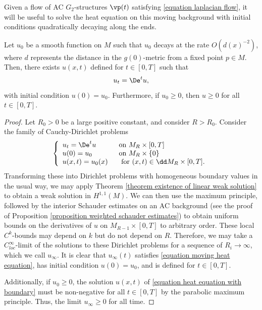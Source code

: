\documentclass[hidelinks, 12pt, oneside, reqno]{amsart}
\begin{document}
Given a flow of AC $G_2$-structures $\vp(t)$ satisfying \eqref{equation laplacian flow}, it will be useful to solve the heat equation on this moving background with initial conditions quadratically decaying along the ends.

\begin{lem}\label{lemma existence of heat solution}
Let $u_0$ be a smooth function on $M$ such that $u_0$ decays at the rate $O(d(x)^{-2})$, where $d$ represents the distance in the $g(0)$-metric from a fixed point $p \in M$. Then, there exists $u(x,t)$ defined for $t \in [0,T]$ such that
\begin{equation}\label{equation moving heat equation}
u_t = \De^t u,
\end{equation}
with initial condition $u(0) = u_0$. Furthermore, if $u_0 \ge 0$, then $u \ge 0$ for all $t \in [0,T]$. 
\end{lem}

\begin{proof}
Let $R_0 >0$ be a large positive constant, and consider $R > R_0$. Consider the family of Cauchy-Dirichlet problems
\begin{equation}\label{equation heat equation with boundary}
    \left\{
    \begin{array}{ll}
      u_t =   \De^t u \;\; &\text{on } M_R \times [0,T]\\
      u(0) = u_0 \;\; &\text{on } M_R \times \{0\}\\ 
      u(x,t) = u_0(x) \;\; &\text{ for }(x,t) \in  \dd M_R \times [0,T].
    \end{array}
  \right.
\end{equation}
Transforming these into Dirichlet problems with homogeneous boundary values in the usual way, we may apply Theorem \ref{theorem existence of linear weak solution} to obtain a weak solution in $H^{1,1}(M)$. We can then use the maximum principle, followed by the interior Schauder estimates on an AC background (see the proof of Proposition \ref{proposition weighted schauder estimates}) to obtain uniform bounds on the derivatives of $u$ on $M_{R-1} \times [0,T]$ to arbitrary order. These local $C^k$-bounds may depend on $k$ but do not depend on $R$. Therefore, we may take a $C^\infty_{loc}$-limit of the solutions to these Dirichlet problems for a sequence of $R_i \rightarrow \infty$, which we call $u_\infty$. It is clear that $u_\infty(t)$ satisfies \eqref{equation moving heat equation}, has initial condition $u(0) = u_0$, and is defined for $t \in [0, T]$. 

Additionally, if $u_0 \ge 0$, the solution $u(x,t)$ of \eqref{equation heat equation with boundary} must be non-negative for all $t \in [0,T]$ by the parabolic maximum principle. Thus, the limit $u_\infty \ge 0$ for all time. 
\end{proof}
\end{document}
